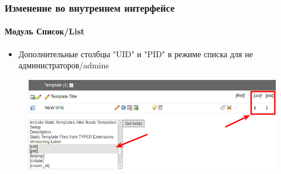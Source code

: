 
\begin{frame}[fragile]
	\frametitle{Изменение во внутреннем интерфейсе}
	\framesubtitle{Модуль Список/List}

	\begin{itemize}
		\item Дополнительные столбцы "UID" и "PID" в режиме списка для не администраторов/admins
	\end{itemize}

	\begin{figure}
		\includegraphics[width=0.95\linewidth]{Images/BackendChanges/AdditionalColumnsInListModule.png}
	\end{figure}

\end{frame}


